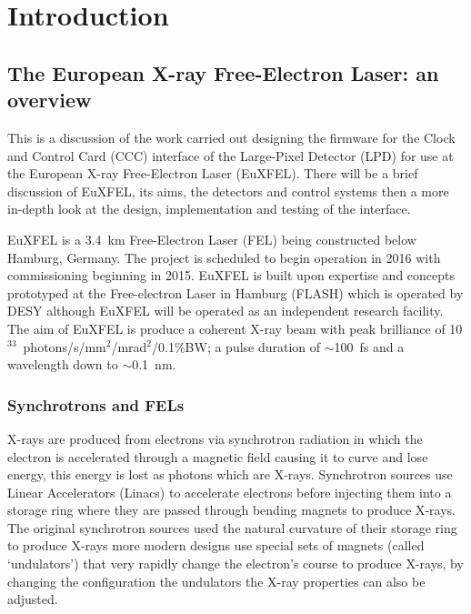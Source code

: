 \chapter{Introduction} %
\label{cha:lpd_ccc_introduction}
\section{The European X-ray Free-Electron Laser: an overview} %
\label{sec:xfel_an_overview}
This is a discussion of the work carried out designing the firmware for the Clock and Control Card (CCC) interface of the Large-Pixel Detector (LPD) for use at the European X-ray Free-Electron Laser (EuXFEL). There will be a brief discussion of EuXFEL, its aims, the detectors and control systems then a more in-depth look at the design, implementation and testing of the interface.

EuXFEL is a 3.4~km Free-Electron Laser (FEL) being constructed below Hamburg, Germany. The project is scheduled to begin operation in 2016 with commissioning beginning in 2015. EuXFEL is built upon expertise and concepts prototyped at the Free-electron Laser in Hamburg (FLASH) which is operated by DESY although EuXFEL will be operated as an independent research facility. The aim of EuXFEL is produce a coherent X-ray beam with peak brilliance of 10\(^{33}\)~photons/s/mm\(^2\)/mrad\(^2\)/0.1\%BW; a pulse duration of \( \sim \)100~fs and a wavelength down to \( \sim \)0.1~nm.


\subsection{Synchrotrons and FELs} %
\label{sub:synchrotrons_and_fels}
X-rays are produced from electrons via synchrotron radiation in which the electron is accelerated through a magnetic field causing it to curve and lose energy, this energy is lost as photons which are X-rays. Synchrotron sources use Linear Accelerators (Linacs) to accelerate electrons before injecting them into a storage ring where they are passed through bending magnets to produce X-rays. The original synchrotron sources used the natural curvature of their storage ring to produce X-rays more modern designs use special sets of magnets (called `undulators') that very rapidly change the electron's course to produce X-rays, by changing the configuration the undulators the X-ray properties can also be adjusted. 

